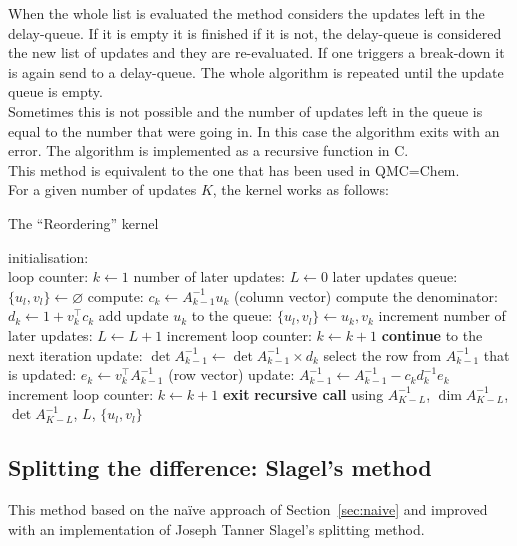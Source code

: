 \documentclass[11pt]{article}
\numberwithin{figure}{section}
\numberwithin{table}{section}
\begin{document}
				When the whole list is evaluated the method considers the updates left in the delay-queue. If it is empty it is finished if it is not, the delay-queue is considered the new list of updates and they are re-evaluated. If one triggers a break-down it is again send to a delay-queue. The whole algorithm is repeated until the update queue is empty.\\
				
				Sometimes this is not possible and the number of updates left in the queue is equal to the number that were going in. In this case the algorithm exits with an error. The algorithm is implemented as a recursive function in C.\\
				
				This method is equivalent to the one that has been used in QMC=Chem.\\
				
				For a given number of updates $K$, the kernel works as follows:\\

				\begin{algorithm}[H]
				\caption{The ``Reordering'' kernel}\label{algo:reordering}
				initialisation:\\
				loop counter: $k \gets 1$\;
				number of later updates: $L \gets 0$\;
				later updates queue: $\{u_l, v_l\} \gets \varnothing$\;
				{
					compute: $c_k \gets A^{-1}_{k-1}u_k$ (column vector)\;
					compute the denominator: $d_k \gets 1 + v_k^\top c_k$\;
					{
						add update $u_k$ to the queue: $\{u_l,v_l\} \gets u_k, v_k$\;
						increment number of later updates: $L \gets L + 1$\;
						increment loop counter: $k \gets k + 1$\;
						\textbf{continue} to the next iteration\;
					}
					update: $\det A^{-1}_{k-1} \gets \det A^{-1}_{k-1}\times d_k$\;
					select the row from $A^{-1}_{k-1}$ that is updated: $e_k \gets v_k^\top A^{-1}_{k-1}$ (row vector)\;
					update: $A^{-1}_{k-1} \gets A^{-1}_{k-1} - c_kd_k^{-1}e_k$\;
					increment loop counter: $k \gets k + 1$\;
				}
				{
					\textbf{exit}\;
				}
				{
					\textbf{recursive call} using $A^{-1}_{K-L}$, $\dim A^{-1}_{K-L}$, $\det A^{-1}_{K-L} $, $L$, $\{u_l, v_l\}$\;
				}
				\end{algorithm}

			\subsection{Splitting the difference: Slagel's method}\label{sec:splitting}
				This method based on the naïve approach of Section~\ref{sec:naive} and improved with an implementation of Joseph Tanner Slagel's splitting method\cite{jtslagel2015}.\\
				
\end{document}
